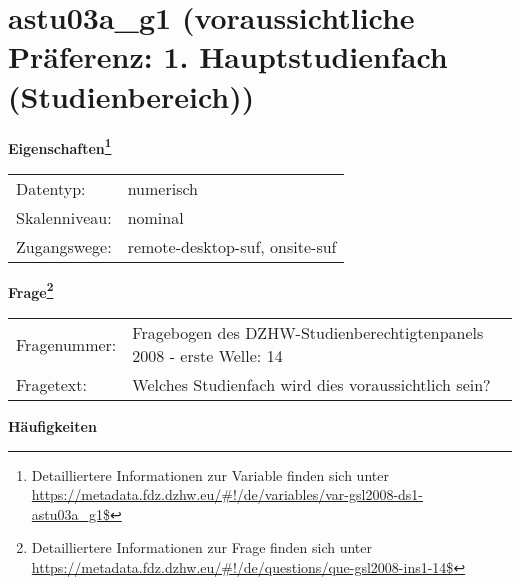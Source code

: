 
    \setcounter{footnote}{0}

    \vspace*{-1.8cm}
	\section{astu03a\_g1 (voraussichtliche Präferenz: 1. Hauptstudienfach (Studienbereich))}
	\label{section:astu03a_g1}



    \vspace*{0.5cm}
    \noindent\textbf{Eigenschaften\footnote{Detailliertere Informationen zur Variable finden sich unter
		\url{https://metadata.fdz.dzhw.eu/\#!/de/variables/var-gsl2008-ds1-astu03a_g1$}}}\\
	\begin{tabularx}{\hsize}{@{}lX}
	Datentyp: & numerisch \\
	Skalenniveau: & nominal \\
	Zugangswege: &
	  remote-desktop-suf, 
	  onsite-suf
 \\
    \end{tabularx}



				\vspace*{0.5cm}
                \noindent\textbf{Frage\footnote{Detailliertere Informationen zur Frage finden sich unter
		              \url{https://metadata.fdz.dzhw.eu/\#!/de/questions/que-gsl2008-ins1-14$}}}\\
				\begin{tabularx}{\hsize}{@{}lX}
					Fragenummer: &
					  Fragebogen des DZHW-Studienberechtigtenpanels 2008 - erste Welle:
					  14
 \\
					Fragetext: & Welches Studienfach wird dies voraussichtlich sein? \\
				\end{tabularx}





        		\vspace*{0.5cm}
                \noindent\textbf{Häufigkeiten}

